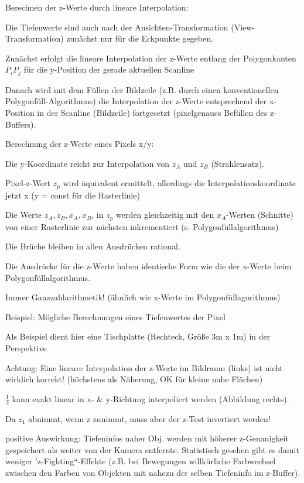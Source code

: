 \documentclass[landscape]{article}
\begin{document}
\begin{multicols}{3}
  Berechnen der z-Werte durch lineare Interpolation:
  \begin{itemize*}
    \item Die Tiefenwerte sind auch nach der Ansichten-Transformation (View-Transformation) zunächst nur für die Eckpunkte gegeben.
    \item Zunächst erfolgt die lineare Interpolation der z-Werte entlang der Polygonkanten $P_i P_j$ für die y-Position der gerade aktuellen Scanline
    \item Danach wird mit dem Füllen der Bildzeile (z.B. durch einen konventionellen Polygonfüll-Algorithmus) die Interpolation der z-Werte entsprechend der x-Position in der Scanline (Bildzeile) fortgesetzt (pixelgenaues Befüllen des z-Buffers).
  \end{itemize*}
  
  Berechnung der z-Werte eines Pixels x/y:
  \begin{itemize*}
    \item Die y-Koordinate reicht zur Interpolation von $z_A$ und $z_B$ (Strahlensatz).
    \item Pixel-z-Wert $z_p$ wird äquivalent ermittelt, allerdings die Interpolationskoordinate jetzt x (y = const für die Rasterlinie)
    \item Die Werte $z_A, z_B, x_A, x_B$, in $z_p$ werden gleichzeitig mit den $x_A$-Werten (Schnitte) von einer Rasterlinie zur nächsten inkrementiert (s. Polygonfüllalgorithmus)
    \item Die Brüche bleiben in allen Ausdrücken rational.
    \item Die Ausdrücke für die z-Werte haben identische Form wie die der x-Werte beim Polygonfüllalgorithmus.
  \end{itemize*}
  
  Immer Ganzzahlarithmetik! (ähnlich wie x-Werte im Polygonfüllagorithmus)
  
  Beispiel: Mögliche Berechnungen eines Tiefenwertes der Pixel
  \begin{itemize*}
    \item Als Beispiel dient hier eine Tischplatte (Rechteck, Größe 3m x 1m) in der Perspektive
    \item Achtung: Eine lineare Interpolation der z-Werte im Bildraum (links) ist nicht wirklich korrekt! (höchstens als Näherung, OK für kleine nahe Flächen)
    \item $\frac{1}{z}$ kann exakt linear in x- \& y-Richtung interpoliert werden (Abbildung rechts).
    \item Da $z_1$ abnimmt, wenn z zunimmt, muss aber der z-Test invertiert werden!
    \item positive Auswirkung: Tiefeninfos naher Obj. werden mit höherer z-Genauigkeit gespeichert als weiter von der Kamera entfernte. Statistisch gesehen gibt es damit weniger 'z-Fighting“-Effekte (z.B. bei Bewegungen willkürliche Farbwechsel zwischen den Farben von Objekten mit nahezu der selben Tiefeninfo im z-Buffer).
  \end{itemize*}
  

\end{multicols}
\end{document}
